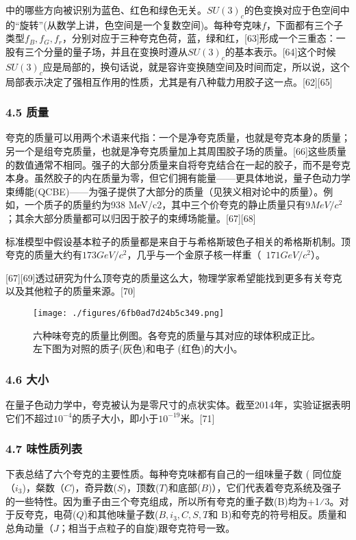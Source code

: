 中的哪些方向被识别为蓝色、红色和绿色无关。$SU(3)_c$的色变换对应于色空间中的“旋转”(从数学上讲，色空间是一个复数空间)。每种夸克味$f$，下面都有三个子类型$f_{B},f_{G},f_{r}$，分别对应于三种夸克色荷，蓝，绿和红，[63]形成一个三重态：一股有三个分量的量子场，并且在变换时遵从$SU(3)_c$的基本表示。[64]这个时候$SU(3)_c$应是局部的，换句话说，就是容许变换随空间及时间而定，所以说，这个局部表示决定了强相互作用的性质，尤其是有八种载力用胶子这一点。[62][65]

\subsubsection{4.5 质量}
夸克的质量可以用两个术语来代指：一个是净夸克质量，也就是夸克本身的质量；另一个是组夸克质量，也就是净夸克质量加上其周围胶子场的质量。[66]这些质量的数值通常不相同。强子的大部分质量来自将夸克结合在一起的胶子，而不是夸克本身。虽然胶子的内在质量为零，但它们拥有能量——更具体地说，量子色动力学束缚能(QCBE)——为强子提供了大部分的质量（见狭义相对论中的质量）。例如，一个质子的质量约为938 MeV/c2，其中三个价夸克的静止质量只有$9MeV/c^2$；其余大部分质量都可以归因于胶子的束缚场能量。[67][68]

标准模型中假设基本粒子的质量都是来自于与希格斯玻色子相关的希格斯机制。顶夸克的质量大约有$173GeV/c^2$，几乎与一个金原子核一样重（~$171GeV/c^2$）。

[67][69]透过研究为什么顶夸克的质量这么大，物理学家希望能找到更多有关夸克以及其他粒子的质量来源。[70]

\begin{figure}[ht]
\centering
\texttt{[image: ./figures/6fb0ad7d24b5c349.png]}
\caption{六种味夸克的质量比例图。各夸克的质量与其对应的球体积成正比。左下图为对照的质子(灰色)和电子 (红色)的大小。} \label{fig_Quark_10}
\end{figure}

\subsubsection{4.6 大小}
在量子色动力学中，夸克被认为是零尺寸的点状实体。截至2014年，实验证据表明它们不超过$10^{-4}$的质子大小，即小于$10^{-19}$米。[71]

\subsubsection{4.7 味性质列表}

下表总结了六个夸克的主要性质。每种夸克味都有自己的一组味量子数 ( 同位旋（$i_3$)，粲数（$C$)，奇异数($S$)，顶数($T$)和底部($B$)），它们代表着夸克系统及强子的一些特性。因为重子由三个夸克组成，所以所有夸克的重子数(B)均为+1⁄3。对于反夸克，电荷($Q$)和其他味量子数($B,i_3,C,S,T\text{和 B}$)和夸克的符号相反。质量和总角动量（$J$；相当于点粒子的自旋)跟夸克符号一致。

